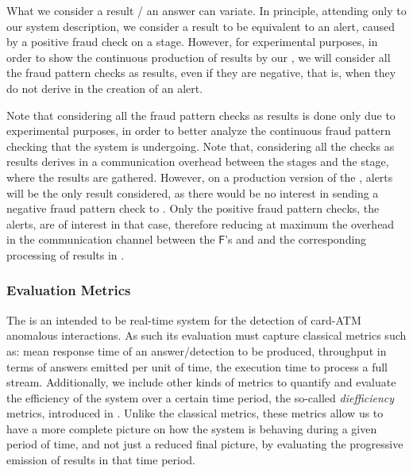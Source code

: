 What we consider a result / an answer can variate. In principle, attending only to our system description, we consider a result to be equivalent to an alert, caused by a positive fraud check on a \filter stage. However, for experimental purposes, in order to show the continuous production of results by our \DPATM, we will consider all the fraud pattern checks as results, even if they are negative, that is, when they do not derive in the creation of an alert. 

Note that considering all the fraud pattern checks as results is done only due to experimental purposes, in order to better analyze the continuous fraud pattern checking that the system is undergoing. Note that, considering all the checks as results derives in a communication overhead between the \filter \F stages and the \sink \Sk stage, where the results are gathered. However, on a production version of the \DPATM, alerts will be the only result considered, as there would be no interest in sending a negative fraud pattern check to \Sk. Only the positive fraud pattern checks, the alerts, are of interest in that case, therefore reducing at maximum the overhead in the communication channel between the $\mathsf{F}$'s and \Sk and the corresponding processing of results in \Sk.

\subsubsection{Evaluation Metrics}\label{exps:evaluation-metrics}

The \DPATM is an intended to be real-time system for the detection of card-ATM anomalous interactions. As such its evaluation must capture classical metrics such as: mean response time of an answer/detection to be produced, throughput in terms of answers emitted per unit of time, the execution time to process a full stream. 
Additionally, we include other kinds of metrics to quantify and evaluate the efficiency of the system over a certain time period, the so-called \emph{diefficiency} metrics, introduced in \cite{exps-diefficiency}. Unlike the classical metrics, these metrics allow us to have a more complete picture on how the system is behaving during a given period of time, and not just a reduced final picture, by evaluating the progressive emission of results in that time period.

